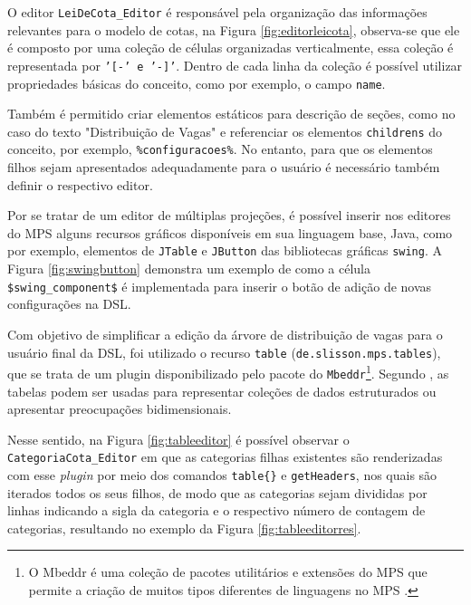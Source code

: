 O editor \texttt{LeiDeCota\_Editor} é responsável pela organização das informações relevantes para o modelo de cotas, na Figura \ref{fig:editorleicota}, observa-se que ele é composto por uma coleção de células organizadas verticalmente, essa coleção é representada por \texttt{'[-' e '-]'}. Dentro de cada linha da coleção é possível utilizar propriedades básicas do conceito, como por exemplo, o campo \texttt{name}. 




\newpage
Também é permitido criar elementos estáticos para descrição de seções, como no caso do texto "Distribuição de Vagas" e referenciar os elementos \texttt{childrens} do conceito, por exemplo, \texttt{\%configuracoes\%}. No entanto, para que os elementos filhos sejam apresentados adequadamente para o usuário é necessário também definir o respectivo editor. 

Por se tratar de um editor de múltiplas projeções, é possível inserir nos editores do \gls{MPS} alguns recursos gráficos disponíveis em sua linguagem base, Java, como por exemplo, elementos de \texttt{JTable} e \texttt{JButton} das bibliotecas gráficas \texttt{swing}. A Figura \ref{fig:swingbutton} demonstra um exemplo de como a célula \texttt{\$swing\_component\$} é implementada para inserir o botão de adição de novas configurações na DSL.



Com objetivo de simplificar a edição da árvore de distribuição de vagas para o usuário final da DSL, foi utilizado o recurso \texttt{table} (\texttt{de.slisson.mps.tables}), que se trata de um plugin disponibilizado pelo pacote do \texttt{Mbeddr}\footnote{O Mbeddr é uma coleção de pacotes utilitários e extensões do MPS que permite a criação de muitos tipos diferentes de linguagens no \gls{MPS} \cite{mbeddr}.}. Segundo , as tabelas podem ser usadas para representar coleções de dados estruturados ou apresentar preocupações bidimensionais.

Nesse sentido, na Figura \ref{fig:tableeditor} é possível observar o \texttt{CategoriaCota\_Editor} em que as categorias filhas existentes são renderizadas com esse \textit{plugin} por meio dos comandos \texttt{table\{\}} e \texttt{getHeaders}, nos quais são iterados todos os seus filhos, de modo que as categorias sejam divididas por linhas indicando a sigla da categoria e o respectivo número de contagem de categorias, resultando no exemplo da Figura \ref{fig:tableeditorres}.

